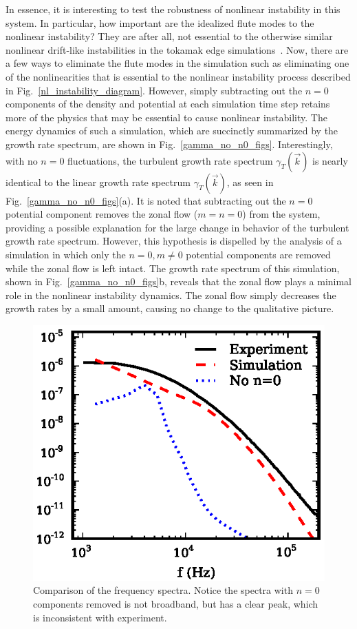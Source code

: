\documentclass[showpacs,preprintnumbers,amsmath,amssymb,superscriptaddress,aip]{revtex4-1}
\begin{document}
In essence, it is interesting to test the robustness of nonlinear instability in this system. In particular, how important are the idealized flute modes to the nonlinear instability?
They are after all, not essential to the otherwise similar nonlinear drift-like instabilities in the tokamak edge simulations~\cite{zeiler1996,zeiler1997,scott2002,scott2003,scott2005}.
Now, there are a few ways to eliminate the flute modes in the simulation such as
eliminating one of the nonlinearities that is essential to the nonlinear instability process described in Fig.~\ref{nl_instability_diagram}. However, simply subtracting out the $n=0$
components of the density and potential at each simulation time step retains more of the physics that may be essential to cause nonlinear instability. The energy dynamics of such a simulation,
which are succinctly summarized by the growth rate spectrum,
are shown in Fig.~\ref{gamma_no_n0_figs}. Interestingly, with no $n=0$
fluctuations, the turbulent growth rate spectrum $\gamma_T(\vec{k})$ is nearly identical to the linear growth rate spectrum $\gamma_T(\vec{k})$, as seen in
Fig.~\ref{gamma_no_n0_figs}(a). It is noted that subtracting out the $n=0$ potential component removes the zonal flow ($m=n=0$) from the system, providing a possible explanation for the large change
in behavior of the turbulent growth rate spectrum. However, this hypothesis is dispelled by the analysis of a simulation in which only the $n=0, m \ne 0$ potential components are removed while 
the zonal flow is left intact. The growth rate spectrum of this simulation, shown in Fig.~\ref{gamma_no_n0_figs}b, reveals that the zonal flow plays a minimal role in the nonlinear instability
dynamics. The zonal flow simply decreases the growth rates by a small amount, causing no change to the qualitative picture. 

\begin{figure}[!htbp]
\includegraphics[]{spectra_3}
\hfil
\caption{Comparison of the frequency spectra. Notice the spectra with $n=0$ components removed is not broadband, but has a clear peak, which is inconsistent with experiment.}
\label{freq_spectra3}
\end{figure}
\end{document}

